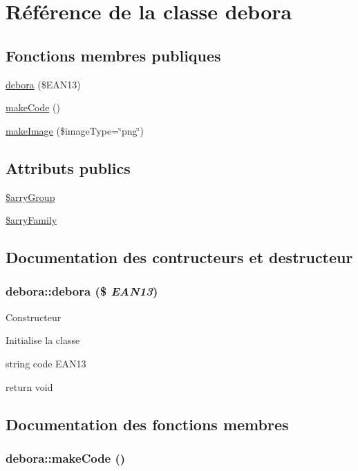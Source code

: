 \hypertarget{classdebora}{
\section{R\'{e}f\'{e}rence de la classe debora}
\label{classdebora}
}
\subsection*{Fonctions membres publiques}
\begin{CompactItemize}
\item 
\hyperlink{classdebora_a0}{debora} (\$EAN13)
\item 
\hyperlink{classdebora_a1}{make\-Code} ()
\item 
\hyperlink{classdebora_a2}{make\-Image} (\$image\-Type=\char`\"{}png\char`\"{})
\end{CompactItemize}
\subsection*{Attributs publics}
\begin{CompactItemize}
\item 
\hyperlink{classdebora_o0}{\$arry\-Group}
\item 
\hyperlink{classdebora_o1}{\$arry\-Family}
\end{CompactItemize}


\subsection{Documentation des contructeurs et destructeur}
\hypertarget{classdebora_a0}{
\subsubsection[debora]{\setlength{\rightskip}{0pt plus 5cm}debora::debora (\$ {\em EAN13})}}
\label{classdebora_a0}


Constructeur

Initialise la classe

string code EAN13

return void 

\subsection{Documentation des fonctions membres}
\hypertarget{classdebora_a1}{
\subsubsection[makeCode]{\setlength{\rightskip}{0pt plus 5cm}debora::make\-Code ()}}
\label{classdebora_a1}


